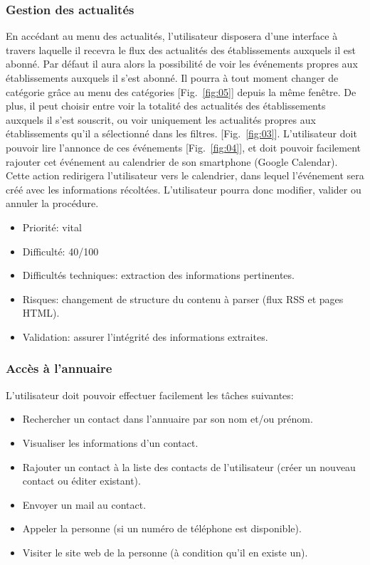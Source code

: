 \subsubsection{Gestion des actualités}
En accédant au menu des actualités, l'utilisateur disposera d'une interface à travers laquelle il recevra le flux des actualités des établissements auxquels il est abonné. Par défaut il aura alors la possibilité de voir les événements propres aux établissements auxquels il s'est abonné. Il pourra à tout moment changer de catégorie grâce au menu des catégories [Fig.~\ref{fig:05}] depuis la même fenêtre. De plus, il peut choisir entre voir la totalité des actualités des établissements auxquels il s'est souscrit, ou voir uniquement les actualités propres aux établissements qu'il a sélectionné dans les filtres.  [Fig.~\ref{fig:03}]. L'utilisateur doit pouvoir lire l'annonce de ces événements [Fig.~\ref{fig:04}], et doit pouvoir facilement rajouter cet événement au calendrier de son smartphone (Google Calendar). Cette action redirigera l'utilisateur vers le calendrier, dans lequel l'événement sera créé avec les informations récoltées. L'utilisateur pourra donc modifier, valider ou annuler la procédure. \\


\begin{itemize}
\renewcommand{\labelitemi}{$\bullet$}
\item Priorité: vital
\item Difficulté: 40/100
\item Difficultés techniques: extraction des informations pertinentes.
\item Risques: changement de structure du contenu à parser (flux RSS et pages HTML).
\item Validation: assurer l'intégrité des informations extraites.
\end{itemize}

\subsubsection{Accès à l'annuaire}
L'utilisateur doit pouvoir effectuer facilement les tâches suivantes:\\
\begin{itemize}
\renewcommand{\labelitemi}{$\bullet$}
\item Rechercher un contact dans l'annuaire par son nom et/ou prénom.
\item Visualiser les informations d'un contact.
\item Rajouter un contact à la liste des contacts de l'utilisateur (créer un nouveau contact ou éditer existant).
\item Envoyer un mail au contact.
\item Appeler la personne (si un numéro de téléphone est disponible).
\item Visiter le site web de la personne (à condition qu'il en existe un).
\end{itemize}

